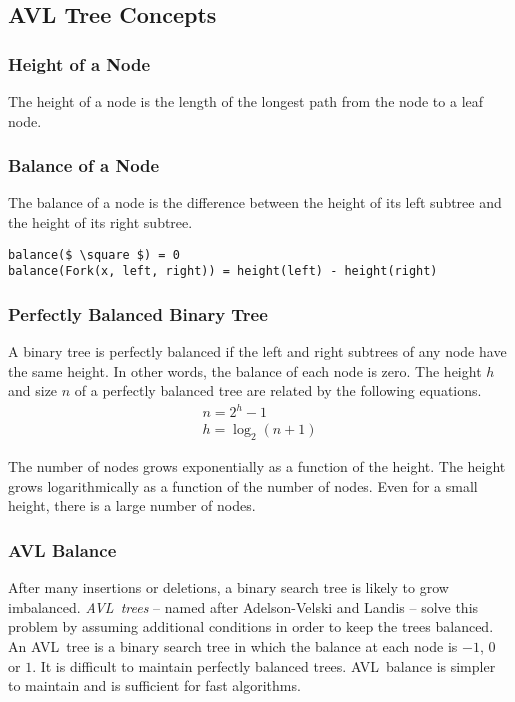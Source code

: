 \subsection{AVL Tree Concepts}

\subsubsection{Height of a Node}

The height of a node is the length of the longest path from the node to a leaf node.

\subsubsection{Balance of a Node}

The balance of a node is the difference between the height of its left subtree and the height of its right subtree.

\begin{lstlisting}[mathescape=true]
balance($ \square $) = 0
balance(Fork(x, left, right)) = height(left) - height(right)
\end{lstlisting}

\subsubsection{Perfectly Balanced Binary Tree}

A binary tree is perfectly balanced if the left and right subtrees of any node have the same height.
In other words, the balance of each node is zero.
The height \( h \) and size \( n \) of a perfectly balanced tree are related by the following equations.
\begin{gather*}
  n = 2^{h} - 1 \\
  h = \log_{2} \left( n + 1 \right)
\end{gather*}

The number of nodes grows exponentially as a function of the height.
The height grows logarithmically as a function of the number of nodes.
Even for a small height, there is a large number of nodes.

\subsubsection{AVL Balance}

After many insertions or deletions, a binary search tree is likely to grow imbalanced.
\emph{AVL~trees} -- named after Adelson-Velski and Landis -- solve this problem by assuming additional conditions in order to keep the trees balanced.
An AVL~tree is a binary search tree in which the balance at each node is \( -1 \), \( 0 \) or \( 1 \).
It is difficult to maintain perfectly balanced trees.
AVL~balance is simpler to maintain and is sufficient for fast algorithms.

